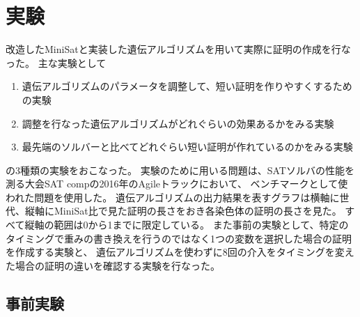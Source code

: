 \newcommand{\myfigure}[2]{
    \begin{figure}[htbp]
        \centering
        \texttt{[image: \#1]}
        \caption{#2}
        \label{fig:#2}
    \end{figure}
}

\newcommand{\reffigure}[1]{図\ref{fig:#1}} %





\section{実験}





改造したMiniSatと実装した遺伝アルゴリズムを用いて実際に証明の作成を行なった。
主な実験として
\begin{enumerate}
    \item 遺伝アルゴリズムのパラメータを調整して、短い証明を作りやすくするための実験
    \item 調整を行なった遺伝アルゴリズムがどれぐらいの効果あるかをみる実験
    \item 最先端のソルバーと比べてどれぐらい短い証明が作れているのかをみる実験
\end{enumerate}
の3種類の実験をおこなった。
実験のために用いる問題は、SATソルバの性能を測る大会SAT compの2016年のAgileトラックにおいて、
ベンチマークとして使われた問題を使用した。
遺伝アルゴリズムの出力結果を表すグラフは横軸に世代、縦軸にMiniSat比で見た証明の長さをおき各染色体の証明の長さを見た。
すべて縦軸の範囲は0から1までに限定している。
また事前の実験として、特定のタイミングで重みの書き換えを行うのではなく1つの変数を選択した場合の証明を作成する実験と、
遺伝アルゴリズムを使わずに8回の介入をタイミングを変えた場合の証明の違いを確認する実験を行なった。





\setcounter{subsection}{-1} %





\subsection{事前実験}


